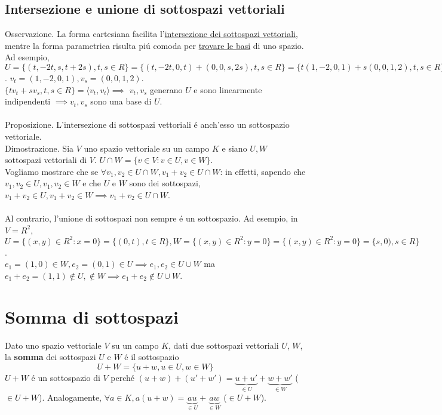 \documentclass{article}
\begin{document}
\subsection{Intersezione e unione di sottospazi vettoriali}
Osservazione. La forma cartesiana facilita l'\underline{intersezione dei sottospazi vettoriali}, mentre la forma parametrica risulta piú comoda per \underline{trovare le basi} di uno spazio.\\
Ad esempio, $U = \{(t,-2t,s,t+2s),t,s \in R\} = \{(t,-2t,0,t) + (0,0,s,2s),t,s \in R\} = \{t(1,-2,0,1) + s(0,0,1,2),t,s \in R\}$. $v_t = (1,-2,0,1), v_s = (0,0,1,2)$.\\
$\{tv_t + sv_s,t,s \in R\} = \langle v_t, v_t \rangle \implies$ $v_t,v_s$ generano $U$ e sono linearmente indipendenti $\implies v_t, v_s$ sono una base di $U$.\\\\
Proposizione. L'intersezione di sottospazi vettoriali é anch'esso un sottospazio vettoriale.\\
Dimostrazione. Sia $V$ uno spazio vettoriale su un campo $K$ e siano $U,W$ sottospazi vettoriali di $V$. $U \cap W = \{v \in V : v \in U, v \in W\}$.\\
Vogliamo mostrare che se $\forall v_1, v_2 \in U \cap W, v_1 + v_2 \in U \cap W$: in effetti, sapendo che $v_1, v_2 \in U, v_1, v_2 \in W$ e che $U$ e $W$ sono dei sottospazi, $v_1 + v_2 \in U, v_1 + v_2 \in W \implies v_1 + v_2 \in U \cap W$.\\\\
Al contrario, l'unione di sottospazi non sempre é un sottospazio. Ad esempio, in $V = R^2$, $U = \{(x,y) \in R^2 : x = 0\} = \{(0,t), t \in R\}, W = \{(x,y) \in R^2 : y = 0\} = \{(x,y) \in R^2 : y = 0\} = \{s,0), s \in R\}$.\\
$e_1 = (1,0) \in W, e_2 = (0,1) \in U \implies e_1, e_2 \in U \cup W$ ma $e_1 + e_2 = (1,1) \notin U, \notin W \implies e_1 + e_2 \notin U \cup W$.

\section{Somma di sottospazi}
Dato uno spazio vettoriale $V$ su un campo $K$, dati due sottospazi vettoriali $U$, $W$, la \textbf{somma} dei sottospazi $U$ e $W$ é il sottospazio $$U + W = \{u+w, u \in U, w \in W\}$$
$U + W$ é un sottospazio di $V$ perché $(u+w) + (u\prime + w\prime) = \underbrace{u + u\prime}_{\in U} + \underbrace{w + w\prime}_{\in W}$ ($\in U + W$). Analogamente, $\forall a \in K, a(u+w) = \underbrace{au}_{\in U} + \underbrace{aw}_{\in W}$ ($\in U + W$).
\end{document}
